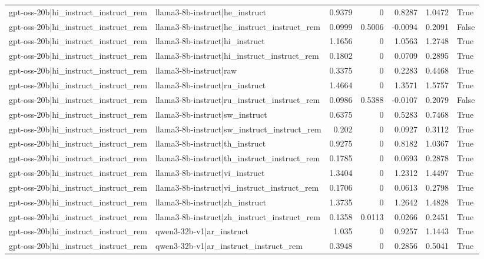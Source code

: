 \begin{table}
\begin{tabular}{l l r r r r l}
gpt-oss-20b|hi_instruct_instruct_rem & llama3-8b-instruct|he_instruct & 0.9379 & 0 & 0.8287 & 1.0472 & True \\
gpt-oss-20b|hi_instruct_instruct_rem & llama3-8b-instruct|he_instruct_instruct_rem & 0.0999 & 0.5006 & -0.0094 & 0.2091 & False \\
gpt-oss-20b|hi_instruct_instruct_rem & llama3-8b-instruct|hi_instruct & 1.1656 & 0 & 1.0563 & 1.2748 & True \\
gpt-oss-20b|hi_instruct_instruct_rem & llama3-8b-instruct|hi_instruct_instruct_rem & 0.1802 & 0 & 0.0709 & 0.2895 & True \\
gpt-oss-20b|hi_instruct_instruct_rem & llama3-8b-instruct|raw & 0.3375 & 0 & 0.2283 & 0.4468 & True \\
gpt-oss-20b|hi_instruct_instruct_rem & llama3-8b-instruct|ru_instruct & 1.4664 & 0 & 1.3571 & 1.5757 & True \\
gpt-oss-20b|hi_instruct_instruct_rem & llama3-8b-instruct|ru_instruct_instruct_rem & 0.0986 & 0.5388 & -0.0107 & 0.2079 & False \\
gpt-oss-20b|hi_instruct_instruct_rem & llama3-8b-instruct|sw_instruct & 0.6375 & 0 & 0.5283 & 0.7468 & True \\
gpt-oss-20b|hi_instruct_instruct_rem & llama3-8b-instruct|sw_instruct_instruct_rem & 0.202 & 0 & 0.0927 & 0.3112 & True \\
gpt-oss-20b|hi_instruct_instruct_rem & llama3-8b-instruct|th_instruct & 0.9275 & 0 & 0.8182 & 1.0367 & True \\
gpt-oss-20b|hi_instruct_instruct_rem & llama3-8b-instruct|th_instruct_instruct_rem & 0.1785 & 0 & 0.0693 & 0.2878 & True \\
gpt-oss-20b|hi_instruct_instruct_rem & llama3-8b-instruct|vi_instruct & 1.3404 & 0 & 1.2312 & 1.4497 & True \\
gpt-oss-20b|hi_instruct_instruct_rem & llama3-8b-instruct|vi_instruct_instruct_rem & 0.1706 & 0 & 0.0613 & 0.2798 & True \\
gpt-oss-20b|hi_instruct_instruct_rem & llama3-8b-instruct|zh_instruct & 1.3735 & 0 & 1.2642 & 1.4828 & True \\
gpt-oss-20b|hi_instruct_instruct_rem & llama3-8b-instruct|zh_instruct_instruct_rem & 0.1358 & 0.0113 & 0.0266 & 0.2451 & True \\
gpt-oss-20b|hi_instruct_instruct_rem & qwen3-32b-v1|ar_instruct & 1.035 & 0 & 0.9257 & 1.1443 & True \\
gpt-oss-20b|hi_instruct_instruct_rem & qwen3-32b-v1|ar_instruct_instruct_rem & 0.3948 & 0 & 0.2856 & 0.5041 & True \\

\end{tabular}
\end{table}
